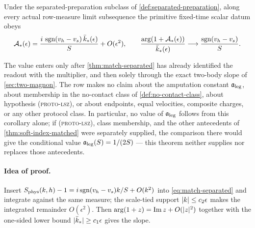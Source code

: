 \begin{theorem}
\label{thm:d29-value-separated}
\statusProved

Under the separated-preparation subclass of
\cref{def:separated-preparation}, along every actual row-measure limit
subsequence the primitive fixed-time scalar datum obeys
\begin{equation}
  \mathcal{A}_*(\epsilon)=\frac{i\,\operatorname{sgn}(v_h-v_s)\,\bar k_*(\epsilon)}{S}
  +O(\epsilon^2),
  \qquad
  \frac{\arg(1+\mathcal{A}_*(\epsilon))}{\bar k_*(\epsilon)}
  \longrightarrow\frac{\operatorname{sgn}(v_h-v_s)}{S}.
  \label{eq:d29-value-sep}
\end{equation}
\end{theorem}

\begin{scope}
\label{scope:d29-value-separated}
The value enters only after \cref{thm:match-separated} has already identified
the readout with the multiplier, and then solely through the exact two-body
slope of \cref{sec:two-magnon}. The row makes no claim about the amputation
constant $\mathfrak{a}_{\mathrm{leg}}$, about membership in the no-contact class of
\cref{def:no-contact-class}, about hypothesis \textsc{(proto-lsz)}, or about
endpoints, equal velocities, composite charges, or any other protocol class.
In particular, no value of $\mathfrak{a}_{\mathrm{leg}}$ follows from this corollary alone; if
\textsc{(proto-lsz)}, class membership, and the other antecedents of
\cref{thm:soft-index-matched} were separately supplied, the comparison there
would give the conditional value $\mathfrak{a}_{\mathrm{leg}}(S)=1/(2S)$ --- this theorem neither
supplies nor replaces those antecedents.
\end{scope}

\paragraph{Idea of proof.} Insert
$S_{\rm phys}(k,h)-1=i\operatorname{sgn}(v_h-v_s)k/S+O(k^2)$ into
\cref{eq:match-separated} and integrate against the same measure; the
scale-tied support $\lvert k\rvert\le c_2\epsilon$ makes the integrated remainder
$O(\epsilon^2)$. Then $\arg(1+z)=\mathrm{Im}\,z+O(\lvert z\rvert^2)$ together with the
one-sided lower bound $\lvert \bar k_*\rvert\ge c_1\epsilon$ gives the slope.


